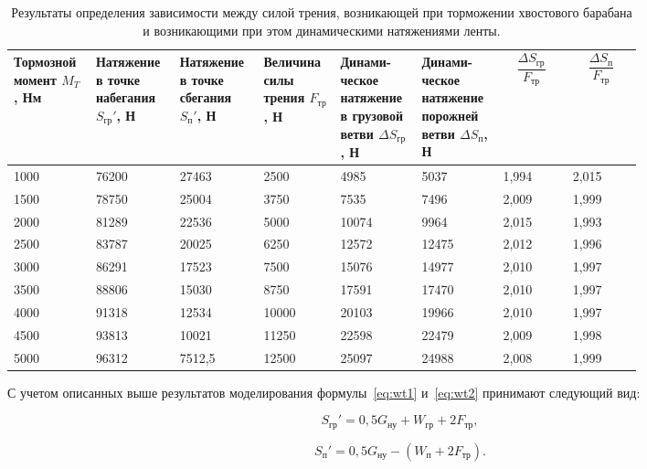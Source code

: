 \begin{table}[h]
\caption{Результаты определения зависимости между силой трения, возникающей при торможении хвостового барабана и возникающими при этом динамическими натяжениями ленты.}
\label{tabl:brake_data}
\begin{center}
\begin{tabular}{|p{0.1\linewidth}|p{0.1\linewidth}|p{0.1\linewidth}|p{0.1\linewidth}|p{0.1\linewidth}|p{0.1\linewidth}|p{0.1\linewidth}|p{0.1\linewidth}|}
\hline
Тормозной момент $ M_T $, Нм & Натяжение в точке набегания $ S_{\text{гр}}' $, Н & Натяжение в точке сбегания $ S_{\text{п}}' $, Н & Величина силы трения $ F_{\text{тр}} $, Н & Динами- ческое натяжение в грузовой ветви $ \Delta S_{\text{гр}} $, Н & Динами- ческое натяжение порожней ветви $ \Delta S_{\text{п}} $, Н & $$ \frac{\Delta S_{\text{гр}}}{F_{\text{тр}}} $$ & $$ \frac{ \Delta S_{\text{п}}}{F_{\text{тр}}} $$\\
\hline
1000 & 76200 & 27463  & 2500  & 4985  & 5037  & 1,994 & 2,015 \\
1500 & 78750 & 25004  & 3750  & 7535  & 7496  & 2,009 & 1,999 \\
2000 & 81289 & 22536  & 5000  & 10074 & 9964  & 2,015 & 1,993 \\
2500 & 83787 & 20025  & 6250  & 12572 & 12475 & 2,012 & 1,996 \\
3000 & 86291 & 17523  & 7500  & 15076 & 14977 & 2,010 & 1,997 \\
3500 & 88806 & 15030  & 8750  & 17591 & 17470 & 2,010 & 1,997 \\
4000 & 91318 & 12534  & 10000 & 20103 & 19966 & 2,010 & 1,997 \\
4500 & 93813 & 10021  & 11250 & 22598 & 22479 & 2,009 & 1,998 \\
5000 & 96312 & 7512,5 & 12500 & 25097 & 24988 & 2,008 & 1,999 \\
\hline
\end{tabular}
\end{center}
\end{table}

С учетом описанных выше результатов моделирования формулы~\ref{eq:wt1} и~\ref{eq:wt2} принимают следующий вид:

\begin{equation}
\label{eq:wt3}
S_{\text{гр}}' = 0,5G_{\text{ну}} + W_{\text{гр}} + 2F_{\text{тр}},
\end{equation}

\begin{equation}
\label{eq:wt4}
S_{\text{п}}' = 0,5G_{\text{ну}} - (W_{\text{п}} + 2F_{\text{тр}}).
\end{equation}

